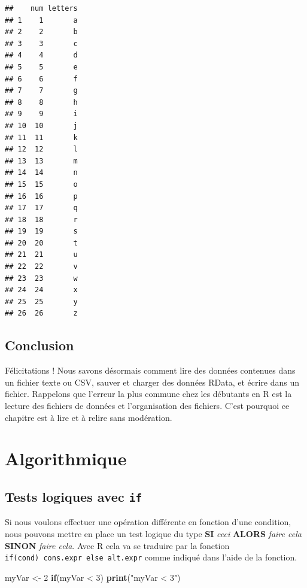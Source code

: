 \documentclass[twoside,symmetric]{book}
\newenvironment{Shaded}{}{}
\newcommand{\ControlFlowTok}[1]{\textbf{#1}}
\newcommand{\DecValTok}[1]{#1}
\newcommand{\KeywordTok}[1]{\textbf{#1}}
\newcommand{\NormalTok}[1]{#1}
\newcommand{\OperatorTok}[1]{#1}
\newcommand{\StringTok}[1]{#1}
\begin{document}
\begin{verbatim}
##    num letters
## 1    1       a
## 2    2       b
## 3    3       c
## 4    4       d
## 5    5       e
## 6    6       f
## 7    7       g
## 8    8       h
## 9    9       i
## 10  10       j
## 11  11       k
## 12  12       l
## 13  13       m
## 14  14       n
## 15  15       o
## 16  16       p
## 17  17       q
## 18  18       r
## 19  19       s
## 20  20       t
## 21  21       u
## 22  22       v
## 23  23       w
## 24  24       x
## 25  25       y
## 26  26       z
\end{verbatim}

\hypertarget{conclusion-5}{%
\section{Conclusion}\label{conclusion-5}}

Félicitations ! Nous savons désormais comment lire des données contenues dans un fichier texte ou CSV, sauver et charger des données RData, et écrire dans un fichier. Rappelons que l'erreur la plus commune chez les débutants en R est la lecture des fichiers de données et l'organisation des fichiers. C'est pourquoi ce chapitre est à lire et à relire sans modération.

\hypertarget{algo}{%
\chapter{Algorithmique}\label{algo}}

\minitoc

\hypertarget{l17if}{%
\section{\texorpdfstring{Tests logiques avec \texttt{if}}{Tests logiques avec if}}\label{l17if}}

Si nous voulons effectuer une opération différente en fonction d'une condition, nous pouvons mettre en place un test logique du type \textbf{SI} \emph{ceci} \textbf{ALORS} \emph{faire cela} \textbf{SINON} \emph{faire cela}. Avec R cela va se traduire par la fonction \texttt{if(cond)\ cons.expr\ else\ alt.expr} comme indiqué dans l'aide de la fonction.

\begin{Shaded}
\begin{Highlighting}[]
\NormalTok{myVar <-}\StringTok{ }\DecValTok{2}
\ControlFlowTok{if}\NormalTok{(myVar }\OperatorTok{<}\StringTok{ }\DecValTok{3}\NormalTok{) }\KeywordTok{print}\NormalTok{(}\StringTok{"myVar < 3"}\NormalTok{)}
\end{Highlighting}
\end{Shaded}
\end{document}

